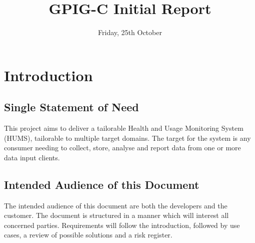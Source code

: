 \documentclass[10pt,a4paper]{article}
\begin{document}
\title{\vspace{-1cm}GPIG-C Initial Report}
\author{}
\date{\vspace{-1cm} Friday, 25th October}
\maketitle
\thispagestyle{fancy} %

\section{Introduction}
\subsection{Single Statement of Need}
This project aims to deliver a tailorable Health and Usage Monitoring System (HUMS), tailorable to multiple target domains. The target for the system is any consumer needing to collect, store, analyse and report data from one or more data input clients.
\subsection{Intended Audience of this Document}
The intended audience of this document are both the developers and the customer. The document is structured in a manner which will interest all concerned parties. Requirements will follow the introduction, followed by use cases, a review of possible solutions and a risk register.
\end{document}
